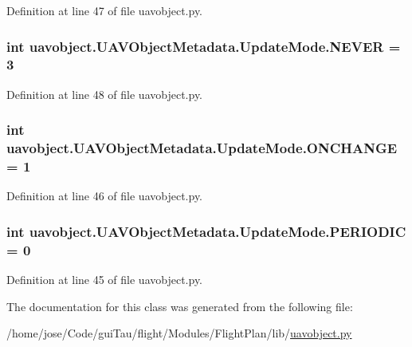 Definition at line 47 of file uavobject.\-py.

\hypertarget{classuavobject_1_1_u_a_v_object_metadata_1_1_update_mode_a80f424691b91d62817388fdc39379a22}{
\subsubsection[{N\-E\-V\-E\-R}]{\setlength{\rightskip}{0pt plus 5cm}int uavobject.\-U\-A\-V\-Object\-Metadata.\-Update\-Mode.\-N\-E\-V\-E\-R = 3\hspace{0.3cm}{\ttfamily [static]}}}\label{classuavobject_1_1_u_a_v_object_metadata_1_1_update_mode_a80f424691b91d62817388fdc39379a22}


Definition at line 48 of file uavobject.\-py.

\hypertarget{classuavobject_1_1_u_a_v_object_metadata_1_1_update_mode_aebc5b1f24a0acf6abd518a3a79165d98}{
\subsubsection[{O\-N\-C\-H\-A\-N\-G\-E}]{\setlength{\rightskip}{0pt plus 5cm}int uavobject.\-U\-A\-V\-Object\-Metadata.\-Update\-Mode.\-O\-N\-C\-H\-A\-N\-G\-E = 1\hspace{0.3cm}{\ttfamily [static]}}}\label{classuavobject_1_1_u_a_v_object_metadata_1_1_update_mode_aebc5b1f24a0acf6abd518a3a79165d98}


Definition at line 46 of file uavobject.\-py.

\hypertarget{classuavobject_1_1_u_a_v_object_metadata_1_1_update_mode_aa80fb8cda3acfa14969d1a40f1fffbbd}{
\subsubsection[{P\-E\-R\-I\-O\-D\-I\-C}]{\setlength{\rightskip}{0pt plus 5cm}int uavobject.\-U\-A\-V\-Object\-Metadata.\-Update\-Mode.\-P\-E\-R\-I\-O\-D\-I\-C = 0\hspace{0.3cm}{\ttfamily [static]}}}\label{classuavobject_1_1_u_a_v_object_metadata_1_1_update_mode_aa80fb8cda3acfa14969d1a40f1fffbbd}


Definition at line 45 of file uavobject.\-py.



The documentation for this class was generated from the following file\-:\begin{DoxyCompactItemize}
\item 
/home/jose/\-Code/gui\-Tau/flight/\-Modules/\-Flight\-Plan/lib/\hyperlink{uavobject_8py}{uavobject.\-py}\end{DoxyCompactItemize}
